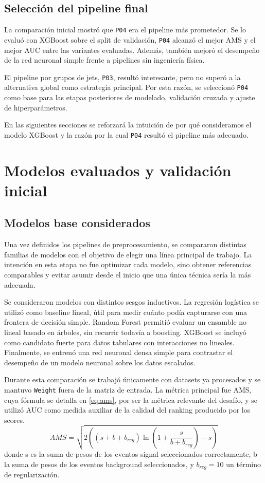 \documentclass{article}
\begin{document}
\subsection{Selección del pipeline final}
La comparación inicial mostró que \texttt{P04} era el pipeline más prometedor. Se lo evaluó con XGBoost sobre el split de validación, \texttt{P04} alcanzó el mejor AMS y el mejor AUC entre las variantes evaluadas. Además, también mejoró el desempeño de la red neuronal simple frente a pipelines sin ingeniería física.

El pipeline por grupos de jets, \texttt{P03}, resultó interesante, pero no superó a la alternativa global como estrategia principal. Por esta razón, se seleccionó \texttt{P04} como base para las etapas posteriores de modelado, validación cruzada y ajuste de hiperparámetros.

En las siguientes secciones se reforzará la intuición de por qué consideramos el modelo XGBoost y la razón por la cual \texttt{P04} resultó el pipeline más adecuado.

\section{Modelos evaluados y validación inicial}
\subsection{Modelos base considerados}
Una vez definidos los pipelines de preprocesamiento, se compararon distintas familias de modelos con el objetivo de elegir una línea principal de trabajo. La intención en esta etapa no fue optimizar cada modelo, sino obtener referencias comparables y evitar asumir desde el inicio que una única técnica sería la más adecuada.

Se consideraron modelos con distintos sesgos inductivos. La regresión logística se utilizó como baseline lineal, útil para medir cuánto podía capturarse con una frontera de decisión simple. Random Forest permitió evaluar un ensamble no lineal basado en árboles, sin recurrir todavía a boosting. XGBoost se incluyó como candidato fuerte para datos tabulares con interacciones no lineales. Finalmente, se entrenó una red neuronal densa simple para contrastar el desempeño de un modelo neuronal sobre los datos escalados.

Durante esta comparación se trabajó únicamente con datasets ya procesados y se mantuvo \texttt{Weight} fuera de la matriz de entrada. La métrica principal fue AMS, cuya fórmula se detalla en \ref{eq:ams}, por ser la métrica relevante del desafío, y se utilizó AUC como medida auxiliar de la calidad del ranking producido por los scores.
\begin{equation}
    \label{eq:ams}
    AMS = \sqrt{2 \left( (s + b + b_{reg}) \ln \left( 1 + \frac{s}{b + b_{reg}} \right) - s \right)}
\end{equation}
donde s es la suma de pesos de los eventos signal seleccionados correctamente, b la suma de pesos de los eventos background seleccionados, y  $b_{reg} = 10$ un término de regularización.
\end{document}
